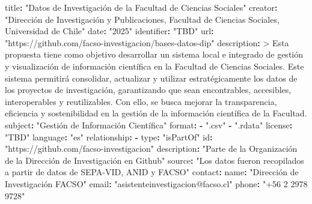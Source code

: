 \documentclass[
  spanish,
  letterpaper,
  DIV=11,
  numbers=noendperiod]{scrreprt}
\newenvironment{Shaded}{\begin{snugshade}}{\end{snugshade}}
\newcommand{\AttributeTok}[1]{\textcolor[rgb]{0.40,0.45,0.13}{#1}}
\newcommand{\CharTok}[1]{\textcolor[rgb]{0.13,0.47,0.30}{#1}}
\newcommand{\FunctionTok}[1]{\textcolor[rgb]{0.28,0.35,0.67}{#1}}
\newcommand{\KeywordTok}[1]{\textcolor[rgb]{0.00,0.23,0.31}{\textbf{#1}}}
\newcommand{\NormalTok}[1]{\textcolor[rgb]{0.00,0.23,0.31}{#1}}
\newcommand{\StringTok}[1]{\textcolor[rgb]{0.13,0.47,0.30}{#1}}
\begin{document}
\begin{Shaded}
\begin{Highlighting}[]
\FunctionTok{title}\KeywordTok{:}\AttributeTok{ }\StringTok{"Datos de Investigación de la Facultad de Ciencias Sociales"}
\FunctionTok{creator}\KeywordTok{:}\AttributeTok{ }\StringTok{"Dirección de Investigación y Publicaciones, Facultad de Ciencias Sociales, Universidad de Chile"}
\FunctionTok{date}\KeywordTok{:}\AttributeTok{ }\StringTok{"2025"}
\FunctionTok{identifier}\KeywordTok{:}\AttributeTok{ }\StringTok{"TBD"}
\FunctionTok{url}\KeywordTok{:}\AttributeTok{ }\StringTok{"https://github.com/facso{-}investigacion/bases{-}datos{-}dip"}
\FunctionTok{description}\KeywordTok{: }\CharTok{\textgreater{}}
\NormalTok{  Esta propuesta tiene como objetivo desarrollar un sistema local e integrado de gestión y visualización de información científica}
\NormalTok{  en la Facultad de Ciencias Sociales. Este sistema permitirá consolidar, actualizar y utilizar estratégicamente los datos de los}
\NormalTok{  proyectos de investigación, garantizando que sean encontrables, accesibles, interoperables y reutilizables. Con ello, se busca }
\NormalTok{  mejorar la transparencia, eficiencia y sostenibilidad en la gestión de la información científica de la Facultad.}
\FunctionTok{subject}\KeywordTok{:}\AttributeTok{ }\StringTok{"Gestión de Información Científica"}
\FunctionTok{format}\KeywordTok{:}\AttributeTok{ }
\AttributeTok{ }\KeywordTok{{-}}\AttributeTok{ }\StringTok{".csv"}
\AttributeTok{ }\KeywordTok{{-}}\AttributeTok{ }\StringTok{".rdata"}
\FunctionTok{license}\KeywordTok{:}\AttributeTok{ }\StringTok{"TBD"}
\FunctionTok{language}\KeywordTok{:}\AttributeTok{ }\StringTok{"es"}
\FunctionTok{relationship}\KeywordTok{:}
\AttributeTok{  }\KeywordTok{{-}}\AttributeTok{ }\FunctionTok{type}\KeywordTok{:}\AttributeTok{ }\StringTok{"isPartOf"}
\AttributeTok{    }\FunctionTok{id}\KeywordTok{:}\AttributeTok{ }\StringTok{"https://github.com/facso{-}investigacion"}
\AttributeTok{    }\FunctionTok{description}\KeywordTok{:}\AttributeTok{ }\StringTok{"Parte de la Organización de la Dirección de Investigación en Github"}
\FunctionTok{source}\KeywordTok{:}\AttributeTok{ }\StringTok{"Los datos fueron recopilados a partir de datos de SEPA{-}VID, ANID y FACSO"}
\FunctionTok{contact}\KeywordTok{:}
\AttributeTok{  }\FunctionTok{name}\KeywordTok{:}\AttributeTok{ }\StringTok{"Dirección de Investigación FACSO"}
\AttributeTok{  }\FunctionTok{email}\KeywordTok{:}\AttributeTok{ }\StringTok{"asistenteinvestigacion@facso.cl"}
\AttributeTok{  }\FunctionTok{phone}\KeywordTok{:}\AttributeTok{ }\StringTok{"+56 2 2978 9728"}


\end{Highlighting}
\end{Shaded}
\end{document}
